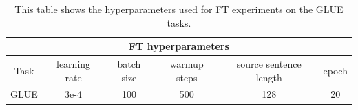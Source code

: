 \begin{table}
  \centering
  \begin{tabular}{cccccc}
    \toprule
    \multicolumn{6}{c}{\textbf{FT hyperparameters}} \\
    \toprule
    Task & learning rate & batch size & warmup steps & source sentence length & epoch \\
    \midrule
    GLUE & 3e-4 & 100 & 500 & 128 & 20 \\
    \bottomrule
  \end{tabular}
  \caption{This table shows the hyperparameters used for FT experiments on the GLUE tasks.}
  \label{tab:pet:glue:ft}
\end{table}